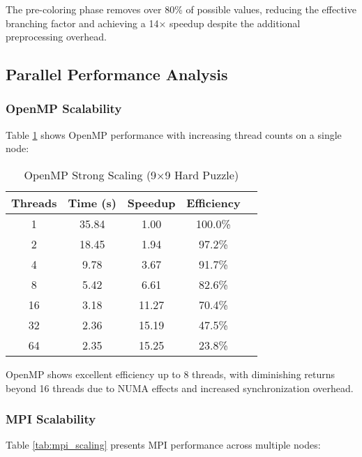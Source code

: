 The pre-coloring phase removes over 80\% of possible values, reducing the effective branching factor and achieving a 14× speedup despite the additional preprocessing overhead.

\subsection{Parallel Performance Analysis}

\subsubsection{OpenMP Scalability}
Table \ref{tab:openmp_scaling} shows OpenMP performance with increasing thread counts on a single node:

\begin{table}[htbp]
\caption{OpenMP Strong Scaling (9×9 Hard Puzzle)}
\begin{center}
\begin{tabular}{@{}ccccc@{}}
\toprule
\textbf{Threads} & \textbf{Time (s)} & \textbf{Speedup} & \textbf{Efficiency} \\
\midrule
1 & 35.84 & 1.00 & 100.0\% \\
2 & 18.45 & 1.94 & 97.2\% \\
4 & 9.78 & 3.67 & 91.7\% \\
8 & 5.42 & 6.61 & 82.6\% \\
16 & 3.18 & 11.27 & 70.4\% \\
32 & 2.36 & 15.19 & 47.5\% \\
64 & 2.35 & 15.25 & 23.8\% \\
\bottomrule
\end{tabular}
\end{center}
\label{tab:openmp_scaling}
\end{table}

OpenMP shows excellent efficiency up to 8 threads, with diminishing returns beyond 16 threads due to NUMA effects and increased synchronization overhead.

\subsubsection{MPI Scalability}
Table \ref{tab:mpi_scaling} presents MPI performance across multiple nodes:

